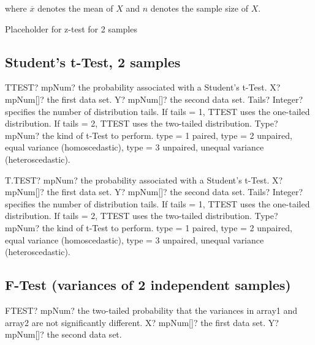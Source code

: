 where $\overline{x}$ denotes the mean of $X$ and $n$ denotes the sample size of $X$.


Placeholder for z-test for 2 samples
\label{2IndependentSamplesZTest}


\subsection{Student's t-Test, 2 samples}
\label{TTest2}
\begin{mpFunctionsExtract}
	\mpWorksheetFunctionFourNotImplemented
	{TTEST? mpNum? the probability associated with a Student's t-Test.}
	{X? mpNum[]? the first data set.}
	{Y? mpNum[]? the second data set.}
	{Tails? Integer?  specifies the number of distribution tails. If tails = 1, TTEST uses the one-tailed distribution. If tails = 2, TTEST uses the two-tailed distribution.}
	{Type? mpNum? the kind of t-Test to perform. type = 1 paired, type = 2 unpaired, equal variance (homoscedastic), type = 3 unpaired, unequal variance (heteroscedastic).}
\end{mpFunctionsExtract}



\vspace{0.6cm}
\begin{mpFunctionsExtract}
	\mpWorksheetFunctionFourNotImplemented
	{T.TEST? mpNum? the probability associated with a Student's t-Test.}
	{X? mpNum[]? the first data set.}
	{Y? mpNum[]? the second data set.}
	{Tails? Integer?  specifies the number of distribution tails. If tails = 1, TTEST uses the one-tailed distribution. If tails = 2, TTEST uses the two-tailed distribution.}
	{Type? mpNum? the kind of t-Test to perform. type = 1 paired, type = 2 unpaired, equal variance (homoscedastic), type = 3 unpaired, unequal variance (heteroscedastic).}
\end{mpFunctionsExtract}




\subsection{F-Test (variances of 2 independent samples)}
\label{FTestVariances}
\begin{mpFunctionsExtract}
	\mpWorksheetFunctionTwoNotImplemented
	{FTEST? mpNum? the two-tailed probability that the variances in array1 and array2 are not significantly different.}
	{X? mpNum[]? the first data set.}
	{Y? mpNum[]? the second data set.}
\end{mpFunctionsExtract}

